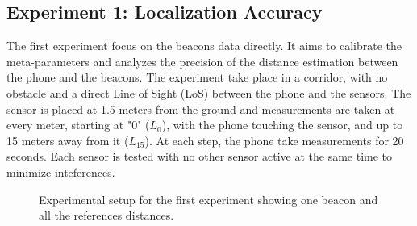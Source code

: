 \subsection{Experiment 1: Localization Accuracy}
\label{exp:1_accuracy}

The first experiment focus on the beacons data directly. It aims to calibrate the meta-parameters and analyzes the precision of the distance estimation between the phone and the beacons. The experiment take place in a corridor, with no obstacle and a direct Line of Sight (LoS) between the phone and the sensors. The sensor is placed at 1.5 meters from the ground and measurements are taken at every meter, starting at "0" ($L_0$), with the phone touching the sensor, and up to 15 meters away from it ($L_{15}$). At each step, the phone take measurements for 20 seconds. Each sensor is tested with no other sensor active at the same time to minimize inteferences.

\begin{figure}[H]
    \centering
    \caption{Experimental setup for the first experiment showing one beacon and all the references distances.}
    \label{fig:exp1_setup}
\end{figure}

